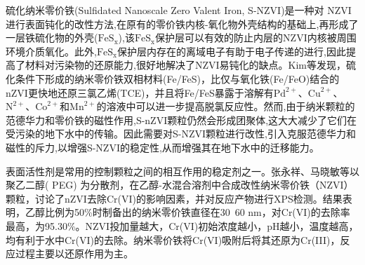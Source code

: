 硫化纳米零价铁(Sulfidated Nanoscale Zero Valent Iron, S-NZVI)是一种对 NZVI 进行表面钝化的改性方法,在原有的零价铁内核-氧化物外壳结构的基础上,再形成了一层铁硫化物的外壳($\mathrm{FeS_x}$),该$\mathrm{FeS_x}$保护层可以有效的防止内层的NZVI内核被周围环境介质氧化\cite{doi:10.1021/acs.est.8b01735}。此外,$\mathrm{FeS_x}$保护层内存在的离域电子有助于电子传递的进行,因此提高了材料对污染物的还原能力,很好地解决了NZVI易钝化的缺点\cite{doi:10.1021/acs.est.8b01735,doi:10.1021/acs.est.6b03997,15}。Kim等\cite{16}发现，硫化条件下形成的纳米零价铁双相材料(Fe/FeS)，比仅与氧化铁(Fe/FeO)结合的nZVI更快地还原三氯乙烯(TCE)，并且将Fe/FeS暴露于溶解有$\mathrm{Pd}^{2+}$、$\mathrm{Cu}^{2+}$、$\mathrm{N}^{2+}$、$\mathrm{Co}^{2+}$和$\mathrm{Mn}^{2+}$的溶液中可以进一步提高脱氯反应性。然而,由于纳米颗粒的范德华力和零价铁的磁性作用,S-nZVI颗粒仍然会形成团聚体,这大大减少了它们在受污染的地下水中的传输。因此需要对S-NZVI颗粒进行改性,引入克服范德华力和磁性的斥力,以增强S-NZVI的稳定性,从而增强其在地下水中的迁移能力。

表面活性剂是常用的控制颗粒之间的相互作用的稳定剂之一。张永祥、马晓敏等\cite{10}以聚乙二醇( PEG) 为分散剂，在乙醇-水混合溶剂中合成改性纳米零价铁（NZVI）颗粒，讨论了nZVI去除Cr(VI)的影响因素，并对反应产物进行XPS检测。结果表明，乙醇比例为50\%时制备出的纳米零价铁直径在30~60 nm，对Cr(VI)的去除率最高，为95.30\%。NZVI投加量越大，Cr(VI)初始浓度越小，pH越小，温度越高，均有利于水中Cr(VI)的去除。纳米零价铁将Cr(VI)吸附后将其还原为Cr(III)，反应过程主要以还原作用为主。



